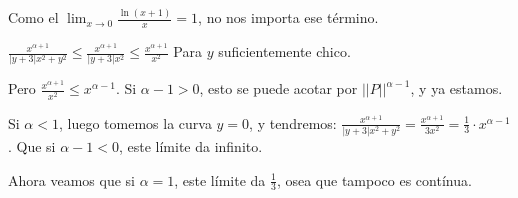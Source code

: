 \documentclass{article}
\begin{document}
Como el $\lim_{x \to 0} \frac{\ln (x+1)}{x} = 1$, no nos importa ese término.

$
\frac{x^{\alpha+1}}{|y+3|x^2 + y^2} \leq
\frac{x^{\alpha+1}}{|y+3|x^2} \leq
\frac{x^{\alpha+1}}{x^2}
$ Para $y$ suficientemente chico.

Pero $
\frac{x^{\alpha+1}}{x^2} \leq
x^{\alpha - 1}
$. Si $\alpha - 1 > 0$, esto se puede acotar por $||P||^{\alpha-1}$, y ya
estamos.

Si $\alpha < 1$, luego tomemos la curva $y = 0$, y tendremos:
$
\frac{x^{\alpha+1}}{|y+3|x^2 + y^2} =
\frac{x^{\alpha+1}}{3x^2} =
\frac{1}{3} \cdot x^{\alpha-1}
$. Que si $\alpha - 1 < 0$, este límite da infinito.

Ahora veamos que si $\alpha = 1$, este límite da $\frac{1}{3}$, osea que tampoco es
contínua.
\end{document}
